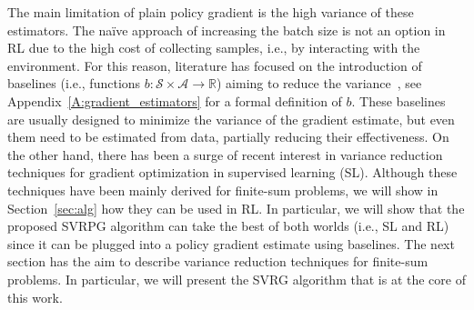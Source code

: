 \documentclass{article}
\makeatletter
\theoremstyle{remark}
\theoremstyle{definition}
\DeclareRobustCommand{\eg}{e.g.,\@\xspace}
\DeclareRobustCommand{\ie}{i.e.,\@\xspace}
\newcommand{\realspace}{\mathbb R}      %
\makeatother
\begin{document}
The main limitation of plain policy gradient is the high variance of these estimators.
The na\"ive approach of increasing the batch size is not an option in RL due to the high cost of collecting samples, \ie by interacting with the environment.
For this reason, literature has focused on the introduction of baselines (\ie functions $b : \mathcal{S} \times \mathcal{A} \to \realspace$) aiming to reduce the variance~\citep[\eg][]{williams1992simple,Peters2008reinf,Thomas2017actionbaseline,wu2018variance}, see Appendix~\ref{A:gradient_estimators} for a formal definition of $b$.
These baselines are usually designed to minimize the variance of the gradient estimate, but even them need to be estimated from data, partially reducing their effectiveness.
On the other hand, there has been a surge of recent interest in variance reduction techniques for gradient optimization in supervised learning (SL).
Although these techniques have been mainly derived for finite-sum problems, we will show in Section~\ref{sec:alg} how they can be used in RL.
In particular, we will show that the proposed SVRPG algorithm can take the best of both worlds (\ie SL and RL) since it can be plugged into a policy gradient estimate using baselines.
The next section has the aim to describe variance reduction techniques for finite-sum problems. In particular, we will present the SVRG algorithm that is at the core of this work.


\vspace{-0.05in}
\end{document}
